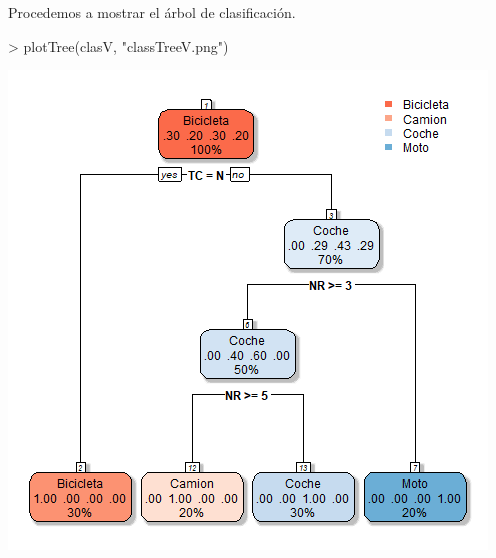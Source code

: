 \documentclass [a4paper] {article}
\begin{document}
\bigskip
Procedemos a mostrar el árbol de clasificación.
\begin{Schunk}
\begin{Sinput}
> plotTree(clasV, "classTreeV.png")
\end{Sinput}
\end{Schunk}
\includegraphics[width=\textwidth]{classTreeV}
\end{document}
